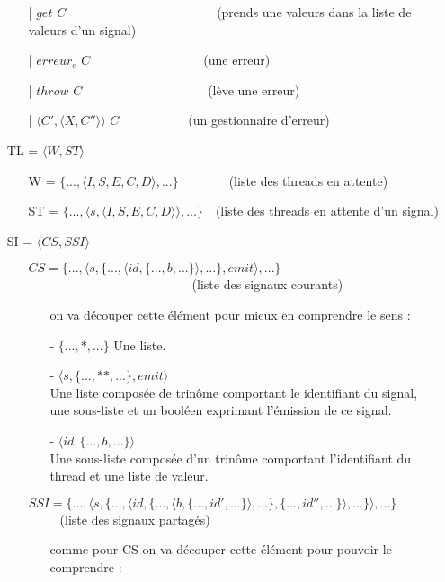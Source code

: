 \documentclass[10pt,a4paper]{article}
\begin{document}
\begin{itemize}
\begin{itemize}
						\item[|] $get$ $C$~~~~~~~~~~~~~~~~~~~~~~~~(prends une valeurs dans la liste de valeurs d'un signal)
						\item[|] $erreur_{e}$ $C$~~~~~~~~~~~~~~~~~~(une erreur)
						\item[|] $throw$ $C$~~~~~~~~~~~~~~~~~~~~(lève une erreur)
						\item[|] $\langle C',\langle X,C''\rangle\rangle$ $C$~~~~~~~~~~~(un gestionnaire d'erreur)
					\end{itemize}
					\item[] TL = $\langle W,ST\rangle$
					\begin{itemize}
						\item[] W = $\{...,\langle I,S,E,C,D\rangle,...\}$~~~~~~~~(liste des threads en attente)
						\item[] ST = $\{...,\langle s,\langle I,S,E,C,D\rangle\rangle,...\}$~~(liste des threads en attente d'un signal)
					\end{itemize}
					\item[] SI = $\langle CS,SSI\rangle$
					\begin{itemize}
						\item[] $CS = \{...,\langle s,\{...,\langle id,\{...,b,...\}\rangle,...\},emit\rangle,...\}$~~~~~~~~~~~~~~~~~~~~~~~~~~(liste des signaux courants)
						\begin{itemize}
							\item [] on va découper cette élément pour mieux en comprendre le sens :
							\item[] - $\{...,*,...\}$ Une liste. 
							\item[] - $\langle s,\{...,**,...\},emit\rangle$ \\
							Une liste composée de trinôme comportant le identifiant du signal, une sous-liste et un booléen exprimant l'émission de ce signal.
							\item[] - $\langle id,\{...,b,...\}\rangle$ \\
							Une sous-liste composée d'un trinôme comportant l'identifiant du thread et une liste de valeur.
						\end{itemize}
						\item[]
						\item[] $SSI =  \{...,\langle s,\{...,\langle id,\{...,\langle b,\{...,id',...\}\rangle,...\},\{...,id'',...\}\rangle,...\}\rangle,...\}$~~~~~(liste des signaux partagés)
						\begin{itemize}
							\item[] comme pour CS on va découper cette élément pour pouvoir le comprendre :

\end{itemize}
\end{itemize}
\end{itemize}
\end{document}
